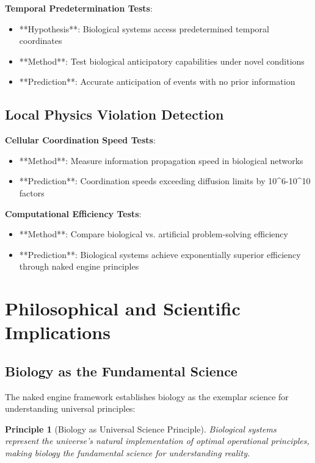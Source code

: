 \documentclass[12pt,a4paper]{article}
\newtheorem{principle}[theorem]{Principle}
\begin{document}
\textbf{Temporal Predetermination Tests}:
\begin{itemize}
\item **Hypothesis**: Biological systems access predetermined temporal coordinates
\item **Method**: Test biological anticipatory capabilities under novel conditions
\item **Prediction**: Accurate anticipation of events with no prior information
\end{itemize}

\subsection{Local Physics Violation Detection}

\textbf{Cellular Coordination Speed Tests}:
\begin{itemize}
\item **Method**: Measure information propagation speed in biological networks
\item **Prediction**: Coordination speeds exceeding diffusion limits by 10^6-10^10 factors
\end{itemize}

\textbf{Computational Efficiency Tests}:
\begin{itemize}
\item **Method**: Compare biological vs. artificial problem-solving efficiency
\item **Prediction**: Biological systems achieve exponentially superior efficiency through naked engine principles
\end{itemize}

\section{Philosophical and Scientific Implications}

\subsection{Biology as the Fundamental Science}

The naked engine framework establishes biology as the exemplar science for understanding universal principles:

\begin{principle}[Biology as Universal Science Principle]
Biological systems represent the universe's natural implementation of optimal operational principles, making biology the fundamental science for understanding reality.
\end{principle}
\end{document}
